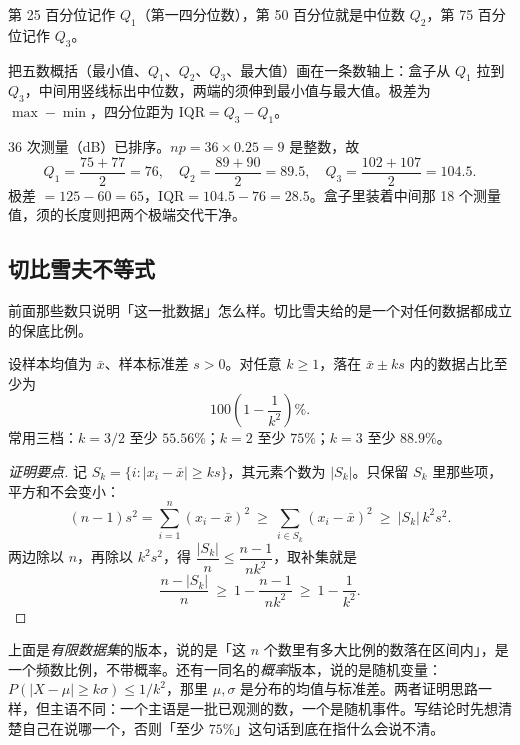 \begin{definition}[四分位数]
第 25 百分位记作 $Q_1$（第一四分位数），第 50 百分位就是中位数 $Q_2$，第 75 百分位记作 $Q_3$。
\end{definition}

\begin{definition}[箱线图]
把五数概括（最小值、$Q_1$、$Q_2$、$Q_3$、最大值）画在一条数轴上：盒子从 $Q_1$ 拉到 $Q_3$，中间用竖线标出中位数，两端的须伸到最小值与最大值。极差为 $\max-\min$，四分位距为 $\mathrm{IQR}=Q_3-Q_1$。
\end{definition}

\begin{example}
36 次测量（dB）已排序。$np=36\times0.25=9$ 是整数，故
\[
Q_1=\frac{75+77}{2}=76,\quad
Q_2=\frac{89+90}{2}=89.5,\quad
Q_3=\frac{102+107}{2}=104.5 .
\]
极差 $=125-60=65$，$\mathrm{IQR}=104.5-76=28.5$。盒子里装着中间那 18 个测量值，须的长度则把两个极端交代干净。
\end{example}

\subsection{切比雪夫不等式}

前面那些数只说明「这一批数据」怎么样。切比雪夫给的是一个对任何数据都成立的保底比例。

\begin{theorem}
设样本均值为 $\bar x$、样本标准差 $s>0$。对任意 $k\ge 1$，落在 $\bar x\pm ks$ 内的数据占比至少为
\[
100\left(1-\frac{1}{k^{2}}\right)\%.
\]
常用三档：$k=3/2$ 至少 $55.56\%$；$k=2$ 至少 $75\%$；$k=3$ 至少 $88.9\%$。
\end{theorem}

\begin{proof}[证明要点]
记 $S_k=\{i:|x_i-\bar x|\ge ks\}$，其元素个数为 $|S_k|$。只保留 $S_k$ 里那些项，平方和不会变小：
\[
(n-1)s^{2}=\sum_{i=1}^{n}(x_i-\bar x)^{2}\ \ge\ \sum_{i\in S_k}(x_i-\bar x)^{2}\ \ge\ |S_k|\,k^{2}s^{2}.
\]
两边除以 $n$，再除以 $k^{2}s^{2}$，得 $\dfrac{|S_k|}{n}\le\dfrac{n-1}{nk^{2}}$，取补集就是
\[
\frac{n-|S_k|}{n}\ \ge\ 1-\frac{n-1}{nk^{2}}\ \ge\ 1-\frac{1}{k^{2}} .
\]
\end{proof}

\begin{remark}[别把两个版本混着说]
上面是\emph{有限数据集}的版本，说的是「这 $n$ 个数里有多大比例的数落在区间内」，是一个频数比例，不带概率。还有一同名的\emph{概率}版本，说的是随机变量：$P(|X-\mu|\ge k\sigma)\le 1/k^{2}$，那里 $\mu,\sigma$ 是分布的均值与标准差。两者证明思路一样，但主语不同：一个主语是一批已观测的数，一个是随机事件。写结论时先想清楚自己在说哪一个，否则「至少 $75\%$」这句话到底在指什么会说不清。
\end{remark}

